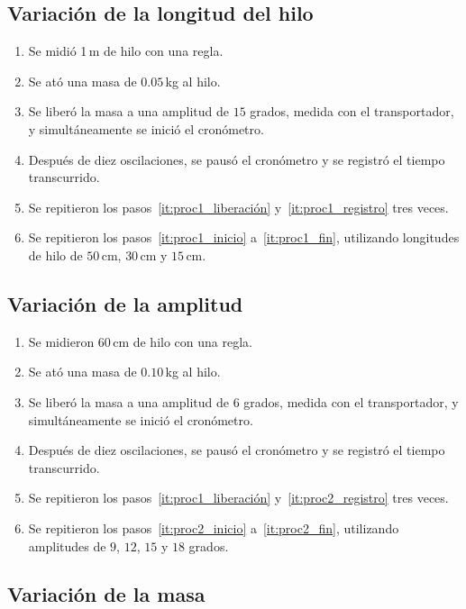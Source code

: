 \documentclass[twocolumn]{article}
\numberwithin{table}{section}
\begin{document}
\subsection{Variación de la longitud del hilo}

\begin{enumerate}
  \item Se midió 1\,m de hilo con una regla.\label{it:proc1_inicio}
  \item Se ató una masa de $0.05$\,kg al hilo.
  \item Se liberó la masa a una amplitud de $15$ grados, medida con
    el transportador, y simultáneamente se inició el
    cronómetro.\label{it:proc1_liberación}
  \item Después de diez oscilaciones, se pausó el cronómetro y se
    registró el tiempo transcurrido.\label{it:proc1_registro}
  \item Se repitieron los pasos~\ref{it:proc1_liberación}
    y~\ref{it:proc1_registro} tres veces.\label{it:proc1_fin}
  \item Se repitieron los pasos~\ref{it:proc1_inicio}
    a~\ref{it:proc1_fin}, utilizando longitudes de hilo de
    $50$\,cm, $30$\,cm y $15$\,cm.
\end{enumerate}

\subsection{Variación de la amplitud}

\begin{enumerate}
  \item Se midieron 60\,cm de hilo con una regla.\label{it:proc2_inicio}
  \item Se ató una masa de $0.10$\,kg al hilo.
  \item Se liberó la masa a una amplitud de $6$ grados, medida con
    el transportador, y simultáneamente se inició el
    cronómetro.
  \item Después de diez oscilaciones, se pausó el cronómetro y se
    registró el tiempo transcurrido.\label{it:proc2_registro}
  \item Se repitieron los pasos~\ref{it:proc1_liberación}
    y~\ref{it:proc2_registro} tres veces.\label{it:proc2_fin}
  \item Se repitieron los pasos~\ref{it:proc2_inicio}
    a~\ref{it:proc2_fin}, utilizando amplitudes de
    $9$, $12$, $15$ y $18$ grados.
\end{enumerate}

\subsection{Variación de la masa}
\end{document}
